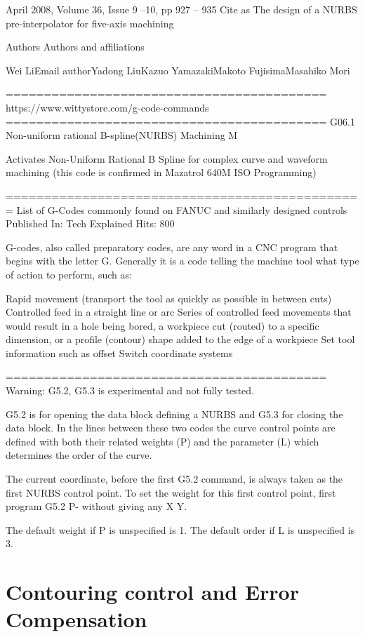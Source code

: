 \begin{tcolorbox}
April 2008, Volume 36, Issue 9 --10, pp 927 -- 935  Cite as
The design of a NURBS pre-interpolator for five-axis machining

Authors
Authors and affiliations

Wei LiEmail authorYadong LiuKazuo YamazakiMakoto FujisimaMasahiko Mori

==========================================
https://www.wittystore.com/g-code-commands
==========================================
G06.1 	Non-uniform rational B-spline(NURBS) Machining 	M 	  	

Activates Non-Uniform Rational B Spline for complex curve and waveform machining (this code is confirmed in Mazatrol 640M ISO Programming)


===============================================
List of G-Codes commonly found on FANUC and similarly designed controls
Published In: Tech Explained Hits: 800

G-codes, also called preparatory codes, are any word in a CNC program that begins with the letter G. Generally it is a code telling the machine tool what type of action to perform, such as:

Rapid movement (transport the tool as quickly as possible in between cuts)
Controlled feed in a straight line or arc
Series of controlled feed movements that would result in a hole being bored, a workpiece cut (routed) to a specific dimension, or a profile (contour) shape added to the edge of a workpiece
Set tool information such as offset
Switch coordinate systems



==========================================
Warning: G5.2, G5.3 is experimental and not fully tested.

G5.2 is for opening the data block defining a NURBS and G5.3 for closing the data block. In the lines between these two codes the curve control points are defined with both their related weights (P) and the parameter (L) which determines the order of the curve.

The current coordinate, before the first G5.2 command, is always taken as the first NURBS control point. To set the weight for this first control point, first program G5.2 P- without giving any X Y.

The default weight if P is unspecified is 1. The default order if L is unspecified is 3.


\end{tcolorbox}

\section{Contouring control and Error Compensation}

